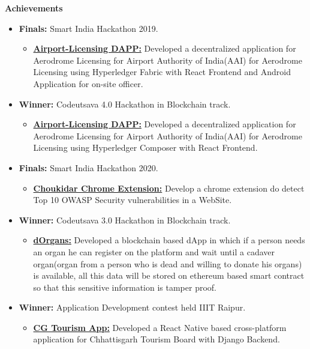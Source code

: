 \documentclass{article}
\begin{document}
\vspace{10pt}
\noindent \large \textbf{\textcolor{NavyBlue}{Achievements}}
\begin{itemize}[noitemsep,nolistsep,leftmargin=*]
    \item { \normalsize \textbf{Finals:} Smart India Hackathon 2019. 
        \begin{itemize}
            \item \normalsize \href{https://github.com/Shritesh99/airport}{\textbf{Airport-Licensing DAPP:}} Developed a decentralized application for Aerodrome Licensing for Airport Authority of India(AAI) for Aerodrome Licensing using Hyperledger Fabric with React Frontend and Android Application for on-site officer.
        \end{itemize}
    }
    \item { \normalsize \textbf{Winner:} Codeutsava 4.0 Hackathon in Blockchain track.
        \begin{itemize}
            \item \normalsize \href{https://github.com/Shritesh99/airport}{\textbf{Airport-Licensing DAPP:}} Developed a decentralized application for Aerodrome Licensing for Airport Authority of India(AAI) for Aerodrome Licensing using Hyperledger Composer with React Frontend.
        \end{itemize}
    }
    \item { \normalsize \textbf{Finals:} Smart India Hackathon 2020. 
        \begin{itemize}
            \item \normalsize \href{https://github.com/siddharthshah3030/choukidar-owasp-security-chrome-extension}{\textbf{Choukidar Chrome Extension:}} Develop a chrome extension do detect Top 10 OWASP Security vulnerabilities in a WebSite.
        \end{itemize}
    }
    \item { \normalsize \textbf{Winner:} Codeutsava 3.0 Hackathon in Blockchain track.
        \begin{itemize}
            \item \normalsize \href{https://bit.ly/healthJ}{\textbf{dOrgans:}} Developed a blockchain based dApp in which if a person needs an organ he can register on the platform and wait until a cadaver organ(organ from a person who is dead and willing to donate his organs) is available, all this data will be stored on ethereum based smart contract so that this sensitive information is tamper proof.
        \end{itemize}
    }
    \item { \normalsize \textbf{Winner:} Application Development contest held IIIT Raipur. 
        \begin{itemize}
            \item \normalsize \href{https://bit.ly/CG_App}{\textbf{CG Tourism App:}} Developed a React Native based cross-platform application for Chhattisgarh Tourism Board with Django Backend.
        \end{itemize}
    }
\end{itemize}
\end{document}
